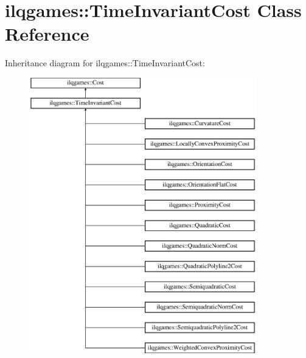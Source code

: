 \hypertarget{classilqgames_1_1_time_invariant_cost}{}\section{ilqgames\+:\+:Time\+Invariant\+Cost Class Reference}
\label{classilqgames_1_1_time_invariant_cost}
Inheritance diagram for ilqgames\+:\+:Time\+Invariant\+Cost\+:\begin{figure}[H]
\begin{center}
\leavevmode
\includegraphics[height=12.000000cm]{classilqgames_1_1_time_invariant_cost}
\end{center}
\end{figure}
